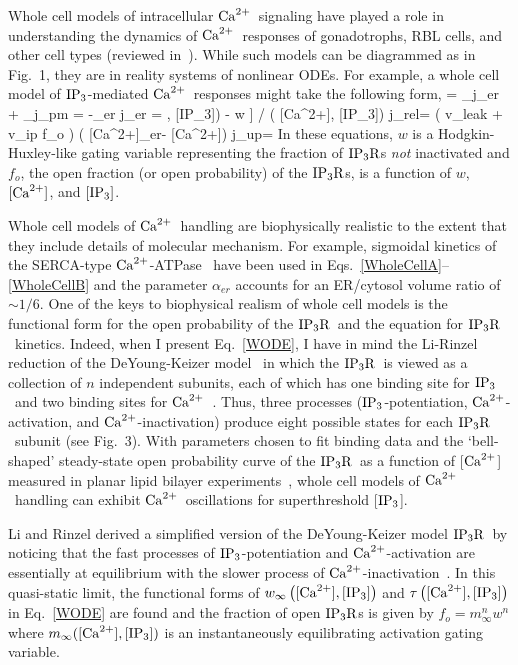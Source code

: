 \documentclass[12pt]{article}
\def\Eq#1{Eq.~\ref{#1}}
\def\Eqs#1#2{Eqs.~\ref{#1}--\ref{#2}}
\def\Ca{${\rm Ca}^{2+}$}
\def\ca{[{\rm Ca}^{2+}]}
\def\ip{[{\rm IP}_{3}]}
\def\cae{[{\rm Ca}^{2+}]_{er}}
\def\Ip{${\rm IP}_{3}$}
\def\Ipr{${\rm IP}_{3}{\rm R}$}
\begin{document}
Whole cell models of intracellular \Ca\ signaling
have played a role in understanding the dynamics of \Ca\ responses
of gonadotrophs, RBL cells, and other cell types (reviewed 
in\ \cite{DuPontEtal91,DuPontGoldbeter92,LiEtal95a,KeizerEtal95}). 
While such models can be diagrammed as in Fig.~1, they are in
reality systems of nonlinear ODEs. For 
example, a whole cell model of \Ip-mediated \Ca\ responses
might take the following form,
\bne 
\ddt{\ca} = _{j_{er}} + _{j_{pm}} \quad\quad
\ddt{\cae} = -\alpha_{er} j_{er} \quad\quad
\label{WholeCellA}
\ene 
\bne 
{} = \left[ w_\infty\left( \ca, \ip \right) - w \right] / \tau 
\left( \ca, \ip \right)  
\label{WODE}
\ene 
\bne j_{rel}= \left( v_{leak} + 
v_{ip} f_o \right) \left( \cae  - \ca \right)
\quad\quad j_{up}=\frac{ v_{p} \ca^2}{\ca^2 + k_{p}^2 } 
\label{WholeCellB}
\ene
In these equations, $w$ is a
Hodgkin-Huxley-like gating variable representing the fraction of \Ipr s {\it
not} inactivated and $f_o$, the open fraction (or open probability) 
of the \Ipr s, is a function of $w$, $\ca$, and $\ip$.  

Whole cell models of \Ca\ handling are biophysically realistic to the extent
that they include details of molecular mechanism.  For example, sigmoidal
kinetics of the SERCA-type \Ca-ATPase\ \cite{LyttonEtal92} have been used 
in \Eqs{WholeCellA}{WholeCellB} and the parameter $\alpha_{er}$ 
accounts for an ER/cytosol volume ratio of $\sim 1/6$. 
One of the keys to biophysical realism of whole cell models 
is the functional form for the open probability of 
the \Ipr\ and the equation for \Ipr\
kinetics. Indeed, when I present \Eq{WODE}, I have in mind 
the Li-Rinzel reduction of the DeYoung-Keizer model\
\cite{DeYoungKeizer92} in which the \Ipr\ is viewed as a collection of $n$
independent subunits, each of which has one binding site for \Ip\ and two
binding sites for \Ca\ \cite{DeYoungKeizer92}.  Thus, three processes
(\Ip-potentiation, \Ca-activation, and \Ca-inactivation) produce eight
possible states for each \Ipr\ subunit (see Fig.~3). 
With parameters chosen
to fit binding data and the `bell-shaped' steady-state open
probability curve of the \Ipr\ as a function of [\Ca] measured
in planar lipid bilayer experiments\ \cite{BezprozvannyEtal91}, whole cell
models of \Ca\ handling can exhibit \Ca\ oscillations for
superthreshold  [\Ip].

Li and Rinzel derived a simplified version of the DeYoung-Keizer model \Ipr\ by
noticing that the fast processes of \Ip-potentiation and \Ca-activation are
essentially at equilibrium with the slower process of \Ca-inactivation\
\cite{ParkerIvorra90,LiRinzel94}.  In this quasi-static limit, the functional
forms of $w_\infty \left( \ca, \ip \right)$ and $\tau \left( \ca, \ip \right)$ in
\Eq{WODE} are found and the fraction of open \Ipr s is given by $f_o =
m_\infty^n w^n$ where $m_{\infty}(\ca,\ip)$ is an instantaneously equilibrating
activation gating variable. 
 

 

\end{document}
